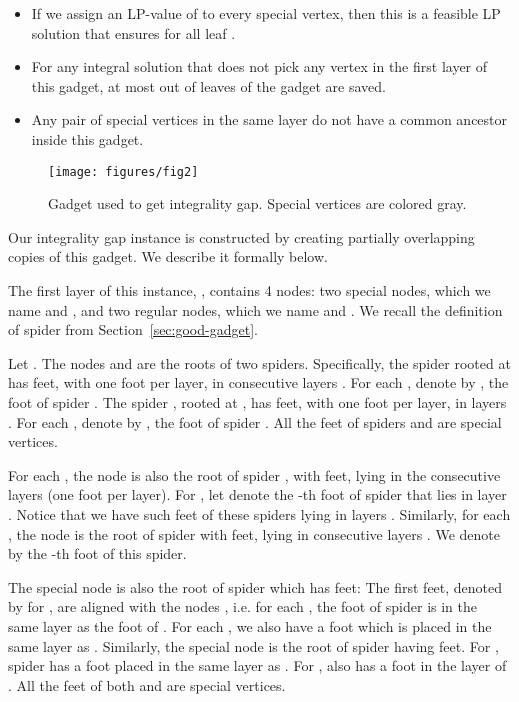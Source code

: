 \begin{itemize}

\item If we assign an LP-value of  to every special vertex, then this is a feasible LP solution that ensures  for all leaf .  

\item For any integral solution  that does not pick any vertex in the first layer of this gadget, at most  out of  leaves of the gadget are saved. 

\item Any pair of special vertices in the same layer do not have a common ancestor inside this gadget. 

\end{itemize}

\begin{wrapfigure}[13]{r}{0.25\textwidth}
\centering
\texttt{[image: figures/fig2]}
\caption{Gadget used to get  integrality gap. Special vertices are colored gray.}
\label{12intgap:gadget}
\end{wrapfigure}

Our integrality gap instance is constructed by creating partially overlapping copies of this gadget.
We describe it formally below.   


\vspace{0.1in} 

The first layer of this instance, , contains 4 nodes: two special nodes, which we
name  and , and two regular nodes, which we name  and .
We recall the definition of spider from Section~\ref{sec:good-gadget}.  


Let . The nodes  and  are
the roots of two spiders. 
Specifically, the spider  rooted at  has  feet, with one foot per layer, in consecutive layers . For each , denote by , the  foot of spider .  
The spider , rooted at , has  feet, with one foot per layer, in layers . 
For each , denote by , the  foot of spider .  
All the feet of spiders  and  are special vertices. 

For each , the node  is also the root of spider , with  feet, lying in the  consecutive layers  (one foot per layer).
For , let  denote the -th foot of spider  that lies in layer .  
Notice that we have  such feet of these spiders  lying in layers . 
Similarly, for each , the node  is the root of spider  with  feet, lying in consecutive layers . 
We denote by  the -th foot of this spider.  

The special node  is also the root of spider  which has  feet: The first  feet, denoted by  for , are aligned with the nodes , i.e. for each , the foot  of spider  is in the same layer as the foot  of . 
For each , we also have a foot  which is placed in the same layer as .
Similarly, the special node  is the root of spider  having  feet. 
For , spider  has a foot  placed in the same layer as . 
For ,  also has a foot  in the layer of .  
All the feet of both  and  are special vertices.

